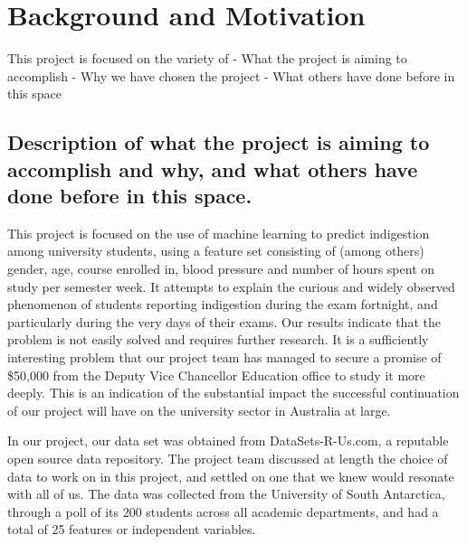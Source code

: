 \documentclass[12pt,a4paper]{article}
\begin{document}
	

	
	\newpage
	
	
	
	\tableofcontents
	\newpage
	\setcounter{page}{1}
	
	\section{Background and Motivation}\label{sec:intro}
    This project is focused on the variety of 
\newline- What the project is aiming to accomplish 
\newline- Why we have chosen the project 
\newline- What others have done before in this space 
    
    \subsection{Description of what the project is aiming to accomplish and why, and what others have done before in this space.}
	This project is focused on the use of machine learning to predict indigestion among university students, using a feature set consisting of (among others) gender, age, course enrolled in, blood pressure and number of hours spent on study per semester week. It attempts to explain the curious and widely observed phenomenon of students reporting indigestion during the exam fortnight, and particularly during the very days of their exams. Our results indicate that the problem is not easily solved and requires further research. It is a sufficiently interesting problem that our project team has managed to secure a promise of \$50,000 from the Deputy Vice Chancellor Education office to study it more deeply. This is an indication of the substantial impact the successful continuation of our project will have on the university sector in Australia at large.
	
	In our project, our data set was obtained from \textsf{DataSets-R-Us.com}, a reputable open source data repository. The project team discussed at length the choice of data to work on in this project, and settled on one that we knew would resonate with all of us. The data was collected from the University of South Antarctica, through a poll of its 200 students across all academic departments, and had a total of 25 features or independent variables.
	
\end{document}
